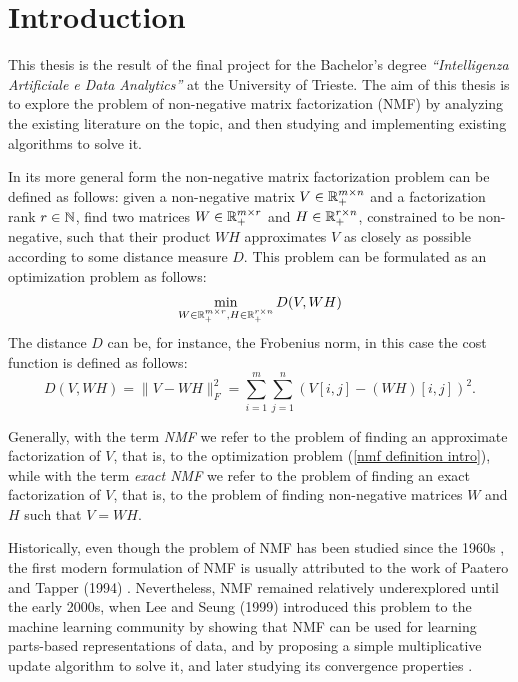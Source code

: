 \chapter{Introduction}\label{INTRO CHAPTER}
This thesis is the result of the final project for the Bachelor's degree \textit{``Intelligenza Artificiale e Data Analytics''} at the University of Trieste.
The aim of this thesis is to explore the problem of non-negative matrix factorization (NMF) by analyzing the existing literature on the topic, 
and then studying and implementing existing algorithms to solve it.

In its more general form the non-negative matrix factorization problem can be defined as follows: given a non-negative matrix $V \in \mathbb{R}_+^{m \times n}$ and a factorization rank $r \in \mathbb{N}$, find two matrices
$W \in \mathbb{R}_+^{m \times r}$ and $H \in \mathbb{R}_+^{r \times n}$, constrained to be non-negative, such that their product $WH$ approximates $V$ as closely as possible according to some distance measure $D$.
This problem can be formulated as an optimization problem as follows:
\begin{equation}\label{nmf definition intro}
\min_{W \in \mathbb{R}_+^{m \times r}, H \in \mathbb{R}_+^{r \times n}} D(V, WH)
\end{equation}
The distance $D$ can be, for instance, the Frobenius norm, in this case the cost function is defined as follows:
\begin{equation}\label{frobenius norm intro}
D(V, WH) = \|V - WH\|_F^2 = \sum_{i=1}^m \sum_{j=1}^n (V[i,j] - (WH)[i,j])^2 .
\end{equation}

Generally, with the term \textit{NMF} we refer to the problem of finding an approximate factorization of $V$, that is, to the optimization problem (\ref{nmf definition intro}), 
while with the term \textit{exact NMF} we refer to the problem of finding an exact factorization of $V$, that is, to the problem of finding non-negative matrices $W$ and $H$ such that $V = WH$.

Historically, even though the problem of NMF has been studied since the 1960s \cite{wallace1960analysis}\cite{imbrie1964vector}, the first modern formulation of NMF is usually attributed to the work of Paatero and Tapper (1994) \cite{paatero1994positive}.
Nevertheless, NMF remained relatively underexplored until the early 2000s, when Lee and Seung (1999) \cite{Lee1999} introduced this problem to the machine learning community by showing that NMF can be used for learning parts-based representations of data, and by proposing a simple multiplicative update algorithm to solve it,
and later studying its convergence properties \cite{lee2000algorithms}.

